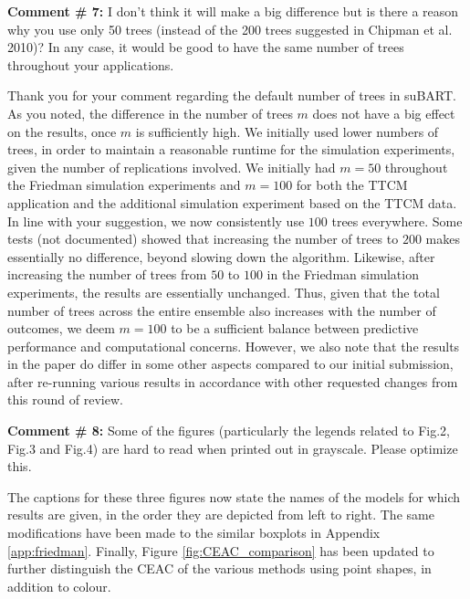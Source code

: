 \documentclass{article}
\begin{document}
\begin{mdframed}
    \textbf{Comment \# 7:} I don't think it will make a big difference but is there a reason why you use only 50 trees (instead of the 200 trees suggested in Chipman et al. 2010)? In any case, it would be good to have the same number of trees throughout your applications.
\end{mdframed}

Thank you for your comment regarding the default number of trees in suBART. As you noted, the difference in the number of trees $m$ does not have a big effect on the results, once $m$ is sufficiently high. We initially used lower numbers of trees, in order to maintain a reasonable runtime for the simulation experiments, given the number of replications involved. We initially had $m=50$ throughout the Friedman simulation experiments and $m=100$ for both the TTCM application and the additional simulation experiment based on the TTCM data. In line with your suggestion, we now consistently use $100$ trees everywhere. Some tests (not documented) showed that increasing the number of trees to $200$ makes essentially no difference, beyond slowing down the algorithm. Likewise, after increasing the number of trees from $50$ to $100$ in the Friedman simulation experiments, the results are essentially unchanged. Thus, given that the total number of trees across the entire ensemble also increases with the number of outcomes, we deem $m=100$ to be a sufficient balance between predictive performance and computational concerns. However, we also note that the results in the paper do differ in some other aspects compared to our initial submission, after re-running various results in accordance with other requested changes from this round of review.

\begin{mdframed}
    \textbf{Comment \# 8:} Some of the figures (particularly the legends related to Fig.2, Fig.3 and Fig.4) are hard to read when printed out in grayscale. Please optimize this.
\end{mdframed}

The captions for these three figures now state the names of the models for which results are given, in the order they are depicted from left to right. The same modifications have been made to the similar boxplots in Appendix \ref{app:friedman}. Finally, Figure \ref{fig:CEAC_comparison} has been updated to further distinguish the CEAC of the various methods using point shapes, in addition to colour.
\end{document}
